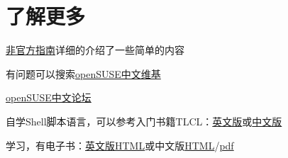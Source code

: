 \chapter{了解更多}
\begin{compactitem}
 \item \href{https://lug.ustc.edu.cn/sites/opensuse-guide/}{非官方指南}详细的介绍了一些简单的内容
 \item 有问题可以搜索\href{https://zh.opensuse.org/%E9%A6%96%E9%A1%B5}{openSUSE中文维基}
 \item \href{https://forum.suse.org.cn/}{openSUSE中文论坛}
 \item 自学Shell脚本语言，可以参考入门书籍TLCL：\href{http://home.ustc.edu.cn/~zpj/doc/Linux/The_Linux_Command_Line.pdf}{英文版}或\href{http://home.ustc.edu.cn/~zpj/doc/Linux/The_Linux_Command_Line(%e4%b8%ad%e6%96%87%e7%89%88).pdf}{中文版}
 \item 学习，有电子书：\href{http://git-scm.com/book/}{英文版HTML}或中文版\href{http://git-scm.com/book/zh}{HTML}/\href{http://liam0205.me/attachment/Git/progit.zh.pdf}{pdf}
\end{compactitem}